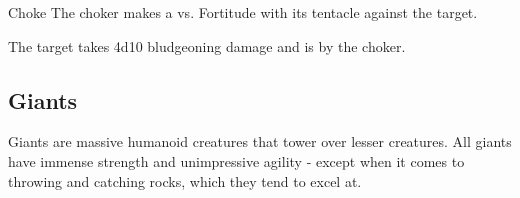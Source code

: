     \begin{freeability}{Choke}
       The choker makes a 
         vs. Fortitude
        with its tentacle against the target.
    
    \hit The target takes 4d10 bludgeoning damage and is  by the choker.
    \end{freeability}
  
    \subsection{Giants}
      
      Giants are massive humanoid creatures that tower over lesser creatures.
      All giants have immense strength and unimpressive agility - except when it comes to throwing and catching rocks, which they tend to excel at.
    

